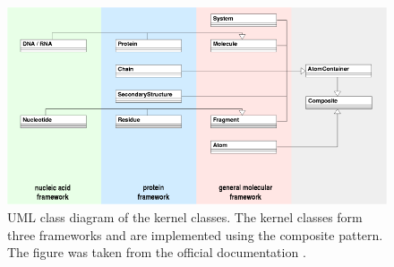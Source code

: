 \begin{figure}[t]
	\centerline{\includegraphics[width=14cm]{gfx/KERNEL.png}}
	\caption{UML class diagram of the kernel classes. The kernel classes form three frameworks and are implemented using the composite pattern. The figure was taken from the official \ball documentation \cite{ball_tutorial}.}
	\label{fig:ball_structure}
\end{figure}
